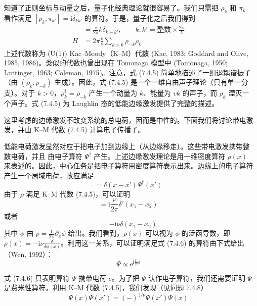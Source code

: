 知道了正则坐标与动量之后，量子化经典理论就很容易了。我们只需把 $\rho_{k}$ 和 $\pi_{k}$ 看作满足 $[\rho_{k},\pi_{k'}]=\mathrm{i}\delta_{kk'}$ 的算符。于是，量子化之后我们得到
\begin{align*}
[\rho_{k},\rho_{k'}]&=\frac{\nu}{2\pi}k\delta_{k+k'},\qquad
k,k'=\text{整数}\times\frac{2\pi}{L} \tag{7.4.5}\\
H&=2\pi\frac{v}{\nu}\sum_{k>0}\rho_{-k}\rho_{k}
\end{align*}
上述代数称为 (U(1)) Kac--Moody（K--M）代数 (Kac, 1983; Goddard and Olive, 1985, 1986)。类似的代数也曾出现在 Tomonaga 模型中 (Tomonaga, 1950; Luttinger, 1963; Coleman, 1975)。注意，式 (7.4.5) 简单地描述了一组退耦谐振子（由 $(\rho_{k},\rho_{-k})$ 生成）。因此，式 (7.4.5) 是一个一维自由声子理论（只有单一分支）。对于 $k>0$，$\rho_{k}^{\dagger}=\rho_{-k}$ 产生一个动量为 $k$、能量为 $vk$ 的声子，而 $\rho_{k}$ 湮灭一个声子。式 (7.4.5) 为 Laughlin 态的低能边缘激发提供了完整的描述。

这里考虑的边缘激发不改变系统的总电荷，因而是中性的。下面我们将讨论带电激发，并由 K--M 代数 (7.4.5) 计算电子传播子。

低能电荷激发显然对应于把电子加到边缘上（从边缘移走）。这些带电激发携带整数电荷，并且
由电子算符 $\Psi^\dagger$ 产生。上述边缘激发理论是用一维密度算符 $\rho(x)$ 来表述的。因此，中心任务是把电子算符用密度算符表示出来。边缘上的电子算符产生一个局域电荷，故应满足
\begin{equation*}
[\rho(x),\Psi^\dagger(x')]=\delta(x-x')\Psi^\dagger(x')
\tag{7.4.6}
\end{equation*}
由于 $\rho$ 满足 K--M 代数 (7.4.5)，可以证明
\begin{equation*}
[\rho(x_1),\rho(x_2)]=\mathrm{i}\frac{\nu}{2\pi}\delta'(x_1-x_2)
\end{equation*}
或者
\begin{equation*}
[\rho(x_1),\phi(x_2)]=-\mathrm{i}\nu\delta(x_1-x_2)
\end{equation*}
其中 $\phi$ 由 $\rho=\frac{1}{2\pi}\partial_x\phi$ 给出。我们看到，$\rho(x)$ 可以视为 $\phi$ 的泛函导数，即 $\rho(x)=-\mathrm{i}\nu\frac{\delta}{\delta\phi(x)}$。利用这一关系，可以证明满足式 (7.4.6) 的算符由下式给出（Wen, 1992）：
\begin{equation*}
\Psi\propto\mathrm{e}^{\mathrm{i}\frac{1}{\nu}\phi}
\tag{7.4.7}
\end{equation*}

式 (7.4.6) 只表明算符 $\Psi$ 携带电荷 $e$。为了把 $\Psi$ 认作电子算符，我们还需要证明 $\Psi$ 是费米性算符。利用 K--M 代数 (7.4.5)，我们发现（见问题 7.4.8）
\begin{equation*}
\Psi(x)\Psi(x')=(-)^{1/\nu}\Psi(x')\Psi(x)
\tag{7.4.8}
\end{equation*}


